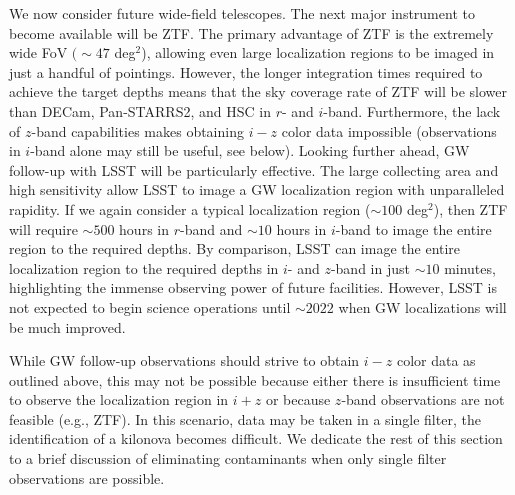 We now consider future wide-field telescopes. The next major instrument to become available will be ZTF. The primary advantage of ZTF is the extremely wide FoV $(\sim47$ deg$^2$), allowing even large localization regions to be imaged in just a handful of pointings. However, the longer integration times required to achieve the target depths means that the sky coverage rate of ZTF will be slower than DECam, Pan-STARRS2, and HSC in $r$- and $i$-band. Furthermore, the lack of $z$-band capabilities makes obtaining $i-z$ color data impossible (observations in $i$-band alone may still be useful, see below). Looking further ahead, GW follow-up with LSST will be particularly effective. The large collecting area and high sensitivity allow LSST to image a GW localization region with unparalleled rapidity. If we again consider a typical localization region ($\sim 100$ deg$^2$), then ZTF will require $\sim500$ hours in $r$-band and $\sim10$ hours in $i$-band to image the entire region to the required depths. By comparison, LSST can image the entire localization region to the required depths in $i$- and $z$-band in just $\sim10$ minutes, highlighting the immense observing power of future facilities. However, LSST is not expected to begin science operations until $\sim2022$ when GW localizations will be much improved.

While GW follow-up observations should strive to obtain $i-z$ color data as outlined above, this may not be possible because either there is insufficient time to observe the localization region in $i+z$ or because $z$-band observations are not feasible (e.g., ZTF). In this scenario, data may be taken in a single filter,  the identification of a kilonova becomes difficult. We dedicate the rest of this section to a brief discussion of eliminating contaminants when only single filter observations are possible. 

